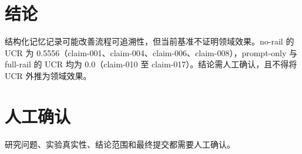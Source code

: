 \documentclass[UTF8]{ctexart}
\begin{document}
\section{结论}
结构化记忆记录可能改善流程可追溯性，但当前基准不证明领域效果。no-\allowbreak{}rail 的 UCR 为 0.5556（claim-\allowbreak{}001、claim-\allowbreak{}004、claim-\allowbreak{}006、claim-\allowbreak{}008），prompt-\allowbreak{}only 与 full-\allowbreak{}rail 的 UCR 均为 0.0（claim-\allowbreak{}010 至 claim-\allowbreak{}017）。结论需人工确认，且不得将 UCR 外推为领域效果。
\section{人工确认}
研究问题、实验真实性、结论范围和最终提交都需要人工确认。
\end{document}
